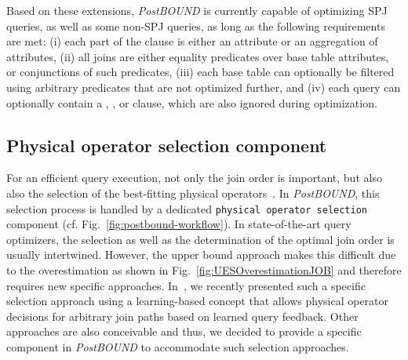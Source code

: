 Based on these extensions, \emph{PostBOUND} is currently capable of optimizing SPJ queries, as well as some non-SPJ queries, as long as the following requirements are met: (i) each part of the  clause is either an attribute or an aggregation of attributes, (ii) all joins are either equality predicates over base table attributes, or conjunctions of such predicates, (iii)  each base table can optionally be filtered using arbitrary predicates that are not optimized further, and (iv) each query can optionally contain a , , or  clause, which are also ignored during optimization.


\subsection{Physical operator selection component}
\label{sec:postbound-operator-selection}

For an efficient query execution, not only the join order is important, but also also the selection of the best-fitting physical operators~\cite{DBLP:journals/pvldb/HertzschuchHHL22}. 
In \emph{PostBOUND}, this selection process is handled by a dedicated \texttt{physical operator selection} component (cf. Fig.~\ref{fig:postbound-workflow}). 
In state-of-the-art query optimizers, the selection as well as the determination of the optimal join order is usually intertwined.
However, the upper bound approach makes this difficult due to the overestimation as shown in Fig.~\ref{fig:UESOverestimationJOB} and therefore requires new specific approaches. 
In~\cite{DBLP:journals/pvldb/HertzschuchHHL22}, we recently presented such a specific selection approach using a learning-based concept that allows physical operator decisions for arbitrary join paths based on learned query feedback. 
Other approaches are also conceivable and thus, we decided to provide a specific component in \emph{PostBOUND} to accommodate such selection approaches. 

